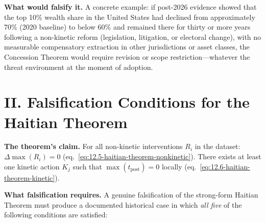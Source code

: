 \textbf{What would falsify it.} A concrete example: if post-2026 evidence showed that the top 10\% wealth share in the United States had declined from approximately 70\% (2020 baseline) to below 60\% and remained there for thirty or more years following a non-kinetic reform (legislation, litigation, or electoral change), with no measurable compensatory extraction in other jurisdictions or asset classes, the Concession Theorem would require revision or scope restriction---whatever the threat environment at the moment of adoption.

\section*{II. Falsification Conditions for the Haitian Theorem}

\textbf{The theorem's claim.} For all non-kinetic interventions $R_i$ in the dataset: $\Delta\max(R_i) = 0$ (eq.~\ref{eq:12.5-haitian-theorem-nonkinetic}). There exists at least one kinetic action $K_j$ such that $\max(t_{\text{post}}) = 0$ locally (eq.~\ref{eq:12.6-haitian-theorem-kinetic}).

\textbf{What falsification requires.} A genuine falsification of the strong-form Haitian Theorem must produce a documented historical case in which \textit{all five} of the following conditions are satisfied:

